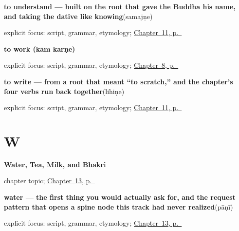 \noindent\begin{minipage}[t]{\linewidth}
\raggedright
\textbf{to understand — built on the root that gave the Buddha his name, and taking the dative like knowing}\enspace\emph{}\enspace(samajṇe)\par
\footnotesize explicit focus: script, grammar, etymology; \hyperref[ch:mr-mind-and-page]{Chapter~11, p.~\pageref*{ch:mr-mind-and-page}}
\end{minipage}\par\smallskip

\noindent\begin{minipage}[t]{\linewidth}
\raggedright
\textbf{to work (kām karṇe)}\enspace\emph{ }\par
\footnotesize explicit focus: script, grammar, etymology; \hyperref[ch:first-verbs]{Chapter~8, p.~\pageref*{ch:first-verbs}}
\end{minipage}\par\smallskip

\noindent\begin{minipage}[t]{\linewidth}
\raggedright
\textbf{to write — from a root that meant \textquotedblleft{}to scratch,\textquotedblright{} and the chapter's four verbs run back together}\enspace\emph{}\enspace(lihiṇe)\par
\footnotesize explicit focus: script, grammar, etymology; \hyperref[ch:mr-mind-and-page]{Chapter~11, p.~\pageref*{ch:mr-mind-and-page}}
\end{minipage}\par\smallskip

\section*{W}

\noindent\begin{minipage}[t]{\linewidth}
\raggedright
\textbf{Water, Tea, Milk, and Bhakri}\par
\footnotesize chapter topic; \hyperref[ch:mr-request-food-drink]{Chapter~13, p.~\pageref*{ch:mr-request-food-drink}}
\end{minipage}\par\smallskip

\noindent\begin{minipage}[t]{\linewidth}
\raggedright
\textbf{water — the first thing you would actually ask for, and the request pattern that opens a spine node this track had never realized}\enspace\emph{}\enspace(pāṇī)\par
\footnotesize explicit focus: script, grammar, etymology; \hyperref[ch:mr-request-food-drink]{Chapter~13, p.~\pageref*{ch:mr-request-food-drink}}
\end{minipage}\par\smallskip

